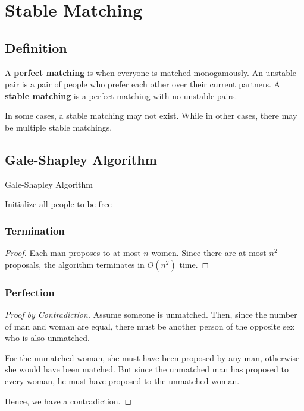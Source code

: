 \documentclass[a4paper,12pt]{article}
\begin{document}
\section{Stable Matching}

\subsection{Definition}

A \textbf{perfect matching} is when everyone is matched monogamously. An unstable pair is a pair of people who prefer each other over their current partners. A \textbf{stable matching} is a perfect matching with no unstable pairs.

In some cases, a stable matching may not exist. While in other cases, there may be multiple stable matchings.

\subsection{Gale-Shapley Algorithm}

\begin{algorithm}[H]
	\caption{Gale-Shapley Algorithm}
	Initialize all people to be free\;
\end{algorithm}

\subsubsection{Termination}

\begin{proof}
Each man proposes to at most $n$ women. Since there are at most $n^2$ proposals, the algorithm terminates in $O(n^2)$ time.
\end{proof}


\subsubsection{Perfection}

\begin{proof}[Proof by Contradiction]
Assume someone is unmatched. Then, since the number of man and woman are equal, there must be another person of the opposite sex who is also unmatched. 

For the unmatched woman, she must have been proposed by any man, otherwise she would have been matched. But since the unmatched man has proposed to every woman, he must have proposed to the unmatched woman. 

Hence, we have a contradiction.
\end{proof}
\end{document}
